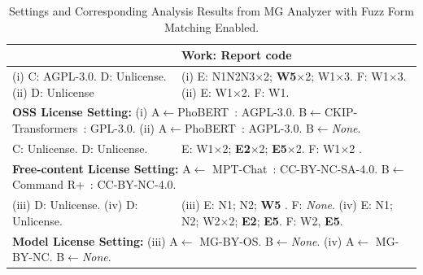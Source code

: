 \begin{table}[tbp]
    \caption{Settings and Corresponding Analysis Results from MG Analyzer with Fuzz Form Matching Enabled.}
    \scriptsize
    \begin{tabular}{|ll|}
    \hline \rowcolor[gray]{.8}
    \multicolumn{1}{|l|}{\textbf{Work: License}} & \textbf{Work: Report code} \\ \hline
    \multicolumn{1}{|p{3.2cm}|}{(i) C: AGPL-3.0. D: Unlicense. \newline (ii) D: Unlicense } & \multicolumn{1}{p{4.5cm}|}{ (i) E: N1N2N3$\times$2; \textbf{W5}$\times$2; W1$\times$3. F: W1$\times$3. \newline (ii) E: W1$\times$2. F: W1.} \\ \hline
    \multicolumn{2}{|p{8cm}|}{\textbf{OSS License Setting:} \newline
    (i) A$\leftarrow$PhoBERT~\cite{nguyen2020phobert}: AGPL-3.0. B$\leftarrow$CKIP-Transformers~\cite{lin2022hantrans}: GPL-3.0. \newline
    (ii) A$\leftarrow$PhoBERT~\cite{nguyen2020phobert}: AGPL-3.0. B$\leftarrow$\emph{None}.
    }\\ \hline \hline

    \multicolumn{1}{|p{3.2cm}|}{C: Unlicense. D: Unlicense.} & E: W1$\times$2; \textbf{E2}$\times$2; \textbf{E5}$\times$2. F: W1$\times$2 . \\ \hline
    \multicolumn{2}{|p{8cm}|}{\textbf{Free-content License Setting:}\newline
        A$\leftarrow$ MPT-Chat~\cite{MosaicML2023Introducing}: CC-BY-NC-SA-4.0.  B$\leftarrow$Command R+~\cite{cohereforai2024c4ai}: CC-BY-NC-4.0.
    } \\ \hline \hline

    \multicolumn{1}{|p{3.2cm}|}{(iii) D: Unlicense. \newline (iv) D: Unlicense.} & \multicolumn{1}{p{4.5cm}|}{ (iii) E: N1; N2; \textbf{W5} . F: \emph{None}. \newline (iv) E: N1; N2; W2$\times$2; \textbf{E2}; \textbf{E5}. F: W2, \textbf{E5}.} \\ \hline
    \multicolumn{2}{|p{8cm}|}{\textbf{Model License Setting:}\newline
        (iii) A$\leftarrow$ MG-BY-OS. B$\leftarrow$\emph{None}. (iv) A$\leftarrow$ MG-BY-NC. B$\leftarrow$\emph{None}.
    } \\ \hline
    \end{tabular}
    \label{tab:result}
\end{table}


